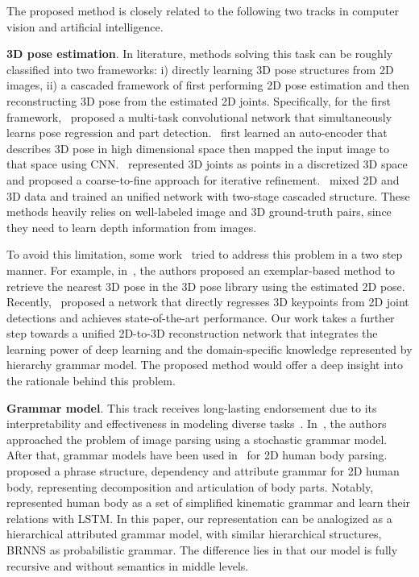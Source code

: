 \documentclass[letterpaper]{article} \usepackage{aaai18}  \usepackage{times}  \usepackage{helvet}  \usepackage{courier}  \usepackage{url}  \usepackage{color}
\begin{document}
The proposed method is closely related to the following two tracks in computer vision and artificial intelligence.

\textbf{3D pose estimation}. In literature, methods solving this task can be roughly classified into two frameworks: i) directly learning 3D pose structures from 2D images, ii) a cascaded framework of first performing 2D pose estimation and then reconstructing 3D pose from the estimated 2D joints. Specifically, for the first framework,~\cite{li20143d} proposed a multi-task convolutional network that simultaneously learns pose regression and part detection.~\cite{tekin2016structured} first learned an auto-encoder that describes 3D pose in high dimensional space then mapped the input image to that space using CNN.~\cite{pavlakos2017volumetric} represented 3D joints as points in a discretized 3D space and proposed a coarse-to-fine approach for iterative refinement.~\cite{zhou2017towards} mixed 2D and 3D data and trained an unified network with two-stage cascaded structure. These methods heavily relies on well-labeled image and 3D ground-truth pairs, since they need to learn depth information from images.

To avoid this limitation, some work~\cite{paul2003fast,jiang20103d,yasin2016dual} tried to address this problem in a two step manner. For example, in~\cite{yasin2016dual}, the authors proposed an exemplar-based method to retrieve the nearest 3D pose in the 3D pose library using the estimated 2D pose. Recently,~\cite{martinez2017simple} proposed a network that directly regresses 3D keypoints from 2D joint detections and achieves state-of-the-art performance. Our work takes a further step towards a unified 2D-to-3D reconstruction network that integrates the learning power of deep learning and the domain-specific knowledge represented by hierarchy grammar model. The proposed method would offer a deep insight into the rationale behind this problem.

\textbf{Grammar model}. This track receives long-lasting endorsement due to its interpretability and effectiveness in modeling diverse tasks~\cite{LiuSIGGRAPH2014,xu2016multi,xu2017multi}. In~\cite{HanTPAMI2009}, the authors approached the problem of image parsing using a stochastic grammar model.  After that, grammar models have been used in~\cite{xu2013reid,xu2014search} for 2D human body parsing. \cite{ParkICCV15} proposed a phrase structure, dependency and attribute grammar for 2D human body, representing decomposition and articulation of body parts. Notably,~\cite{Nie3DPoseCVPR17} represented human body as a set of simplified kinematic grammar and learn their relations with LSTM. In this paper, our representation can be analogized as a hierarchical attributed grammar model, with similar hierarchical structures, BRNNS as probabilistic grammar. The difference lies in that our model is fully recursive and without semantics in middle levels.
\end{document}
